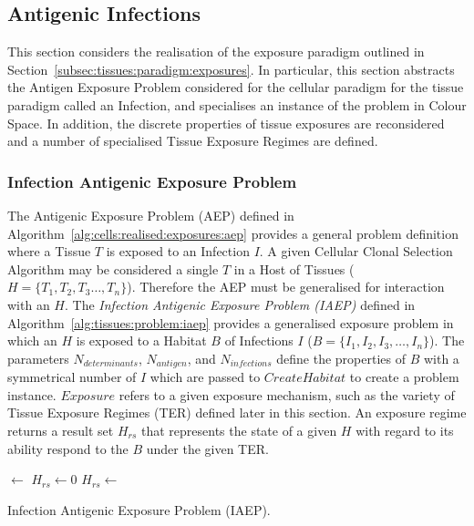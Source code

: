 %
%
\subsection{Antigenic Infections}
\label{subsec:tissues:paradigm:method:problems}
This section considers the realisation of the exposure paradigm outlined in Section~\ref{subsec:tissues:paradigm:exposures}. In particular, this section abstracts the Antigen Exposure Problem considered for the cellular paradigm for the tissue paradigm called an Infection, and specialises an instance of the problem in Colour Space. In addition, the discrete properties of tissue exposures are reconsidered and a number of specialised Tissue Exposure Regimes are defined.

%
%
\subsubsection{Infection Antigenic Exposure Problem}
The Antigenic Exposure Problem (AEP) defined in Algorithm~\ref{alg:cells:realised:exposures:aep} provides a general problem definition where a Tissue $T$ is exposed to an Infection $I$. A given Cellular Clonal Selection Algorithm may be considered a single $T$ in a Host of Tissues ($H = \{T_1, T_2, T_3 \ldots, T_n\}$). Therefore the AEP must be generalised for interaction with an $H$. The \emph{Infection Antigenic Exposure Problem (IAEP)} defined in Algorithm~\ref{alg:tissues:problem:iaep} provides a generalised exposure problem in which an $H$ is exposed to a Habitat $B$ of Infections $I$ ($B = \{I_1, I_2, I_3, \ldots, I_n\}$).
The parameters $N_{determinants}$, $N_{antigen}$, and $N_{infections}$ define the properties of $B$ with a symmetrical number of $I$ which are passed to $CreateHabitat$ to create a problem instance. $Exposure$ refers to a given exposure mechanism, such as the variety of Tissue Exposure Regimes (TER) defined later in this section. An exposure regime returns a result set $H_{rs}$ that represents the state of a given $H$ with regard to its ability respond to the $B$ under the given TER.

\begin{algorithm}[ht]	
	\SetLine
	
  \Habitat $\leftarrow$ \;
  $H_{rs} \leftarrow$0\;
	\While{$\neg$\StopCondition{}}
	{
		$H_{rs} \leftarrow$ \Exposure{\Host, \Habitat}\;
	} 
	\;
	
	\caption{Infection Antigenic Exposure Problem (IAEP).}
	\label{alg:tissues:problem:iaep}
\end{algorithm}

